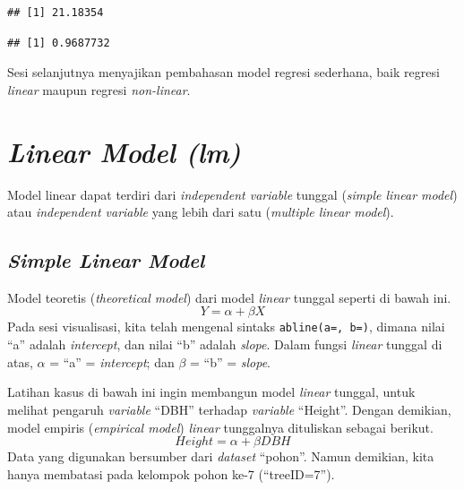 \documentclass[
  12pt,
  a4paper,
]{scrbook}
\newenvironment{Shaded}{\begin{snugshade}}{\end{snugshade}}
\newcommand{\CommentTok}[1]{\textcolor[rgb]{0.56,0.35,0.01}{\textit{#1}}}
\newcommand{\KeywordTok}[1]{\textcolor[rgb]{0.13,0.29,0.53}{\textbf{#1}}}
\newcommand{\NormalTok}[1]{#1}
\newcommand{\OperatorTok}[1]{\textcolor[rgb]{0.81,0.36,0.00}{\textbf{#1}}}
\begin{document}
\begin{verbatim}
## [1] 21.18354
\end{verbatim}

\begin{Shaded}
\end{Shaded}

\begin{verbatim}
## [1] 0.9687732
\end{verbatim}

Sesi selanjutnya menyajikan pembahasan model regresi sederhana, baik
regresi \emph{linear} maupun regresi \emph{non-linear}.

\newpage

\hypertarget{linear-model-lm}{%
\section{\texorpdfstring{\emph{Linear Model
(lm)}}{Linear Model (lm)}}\label{linear-model-lm}}

Model linear dapat terdiri dari \emph{independent variable} tunggal
(\emph{simple linear model}) atau \emph{independent variable} yang lebih
dari satu (\emph{multiple linear model}).

\hypertarget{simple-linear-model}{%
\subsection{\texorpdfstring{\emph{Simple Linear
Model}}{Simple Linear Model}}\label{simple-linear-model}}

Model teoretis (\emph{theoretical model}) dari model \emph{linear}
tunggal seperti di bawah ini. \[ Y = \alpha + \beta X \] Pada sesi
visualisasi, kita telah mengenal sintaks \texttt{abline(a=,\ b=)},
dimana nilai ``a'' adalah \emph{intercept}, dan nilai ``b'' adalah
\emph{slope}. Dalam fungsi \emph{linear} tunggal di atas, \(\alpha\) =
``a'' = \emph{intercept}; dan \(\beta\) = ``b'' = \emph{slope}.

Latihan kasus di bawah ini ingin membangun model \emph{linear} tunggal,
untuk melihat pengaruh \emph{variable} ``DBH'' terhadap \emph{variable}
``Height''. Dengan demikian, model empiris (\emph{empirical model})
\emph{linear} tunggalnya dituliskan sebagai berikut.
\[ Height = \alpha + \beta DBH \] Data yang digunakan bersumber dari
\emph{dataset} ``pohon''. Namun demikian, kita hanya membatasi pada
kelompok pohon ke-7 (``treeID=7'').
\end{document}
